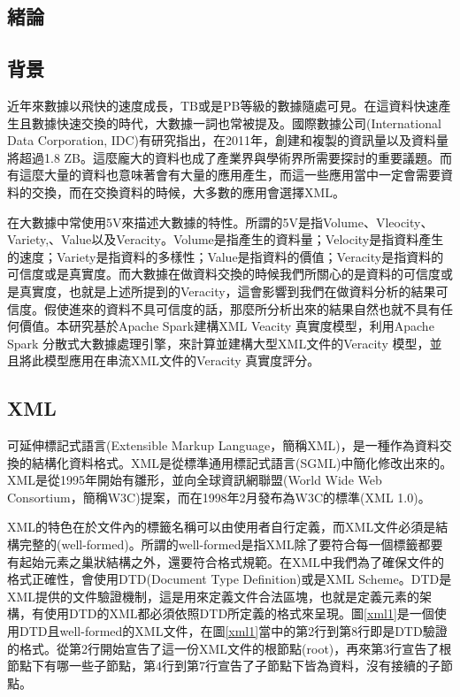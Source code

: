 \begin{center}
\section{緒論}
\end{center}

\subsection{背景}
近年來數據以飛快的速度成長，TB或是PB等級的數據隨處可見。在這資料快速產生且數據快速交換的時代，大數據一詞也常被提及。國際數據公司(International Data Corporation, IDC)有研究指出\cite{gantz2011extracting}，在2011年，創建和複製的資訊量以及資料量將超過1.8 ZB。這麼龐大的資料也成了產業界與學術界所需要探討的重要議題。而有這麼大量的資料也意味著會有大量的應用產生，而這一些應用當中一定會需要資料的交換，而在交換資料的時候，大多數的應用會選擇XML。\\\par
在大數據中常使用5V\cite{ibm5v}\cite{khan2014big}來描述大數據的特性。所謂的5V是指Volume、Vleocity、Variety,、Value以及Veracity。Volume是指產生的資料量；Velocity是指資料產生的速度；Variety是指資料的多樣性；Value是指資料的價值；Veracity\cite{veracityimpor}是指資料的可信度或是真實度。而大數據在做資料交換的時候我們所關心的是資料的可信度或是真實度，也就是上述所提到的Veracity，這會影響到我們在做資料分析的結果可信度。假使進來的資料不具可信度的話，那麼所分析出來的結果自然也就不具有任何價值。本研究基於Apache Spark建構XML Veacity 真實度模型，利用Apache Spark 分散式大數據處理引擎，來計算並建構大型XML文件的Veracity 模型，並且將此模型應用在串流XML文件的Veracity 真實度評分。

\subsection{XML}
可延伸標記式語言(Extensible Markup Language，簡稱XML)\cite{rfc7303}，是一種作為資料交換的結構化資料格式。XML是從標準通用標記式語言(SGML)中簡化修改出來的。XML是從1995年開始有雛形，並向全球資訊網聯盟(World Wide Web Consortium，簡稱W3C)提案，而在1998年2月發布為W3C的標準(XML 1.0)。\\\par
XML的特色在於文件內的標籤名稱可以由使用者自行定義，而XML文件必須是結構完整的(well-formed)。所謂的well-formed是指XML除了要符合每一個標籤都要有起始元素之巢狀結構之外，還要符合格式規範。在XML中我們為了確保文件的格式正確性，會使用DTD(Document Type Definition)\cite{dtd}或是XML Scheme\cite{xsd}。DTD是XML提供的文件驗證機制，這是用來定義文件合法區塊，也就是定義元素的架構，有使用DTD的XML都必須依照DTD所定義的格式來呈現。圖\ref{xml1}是一個使用DTD且well-formed的XML文件，在圖\ref{xml1}當中的第2行到第8行即是DTD驗證的格式。從第2行開始宣告了這一份XML文件的根節點(root)，再來第3行宣告了根節點下有哪一些子節點，第4行到第7行宣告了子節點下皆為資料，沒有接續的子節點。

